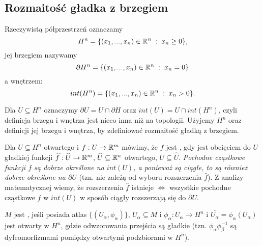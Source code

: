 \subsection{Rozmaitość gładka z brzegiem}

\begin{bbox}
Rzeczywistą półprzestrzeń oznaczamy
$$H^n=\{(x_1,...,x_n)\in\mathbb{R}^n\;:\;x_n\geq 0\},$$
jej brzegiem nazywamy
$$\partial H^n=\{(x_1,...,x_n)\in\mathbb{R}^n\;:\;x_n=0\}$$
a wnętrzem:
$$int(H^n)=\{(x_1,..., x_n)\in\mathbb{R}^n\;:\;x_n>0\}.$$

Dla $U\subseteq H^n$ oznaczymy $\partial U=U\cap \partial H$ oraz $int(U)=U\cap int(H^n)$, czyli definicja brzegu i wnętrza jest nieco inna niż na topologii. Użyjemy $H^n$ oraz definicji jej brzegu i wnętrza, by zdefiniować rozmaitość gładką z brzegiem.
\end{bbox}

Dla $U\subseteq H^n$ otwartego i $f:U\to\mathbb{R}^m$ mówimy, że $f$ jest , gdy jest obcięciem do $U$ gładkiej funkcji $\widehat{f}:\widehat{U}\to\mathbb{R}^m$, $\widehat{U}\subseteq\mathbb{R}^n$ otwartego, $U\subseteq\hat{U}$. \emph{Pochodne cząstkowe funkcji $f$ są dobrze określone na $int(U)$, a ponieważ są ciągłe, to są również dobrze określone na $\partial U$} (tzn. nie zależą od wyboru rozszerzenia $\hat{f}$). Z analizy matematycznej wiemy, że rozszerzenia $\hat{f}$ istnieje $\iff$ wszystkie pochodne cząstkowe $f$ w $int(U)$ w sposób ciągły rozszerzają się do $\partial U$.

\begin{definition}
  $M$ jest , jeśli posiada atlas $\{(U_\alpha,\phi_\alpha)\}$, $U_\alpha\subseteq M$ i $\phi_\alpha:U_\alpha\to H^n$ i $\overline{U_\alpha}=\phi_\alpha(U_\alpha)$ jest otwarty w $H^n$, gdzie odwzorowania przejścia są gładkie (tzn. $\phi_\alpha\phi_\beta^{-1}$ są dyfeomorfizmami pomiędzy otwartymi podzbiorami w $H^n$).
\end{definition}


